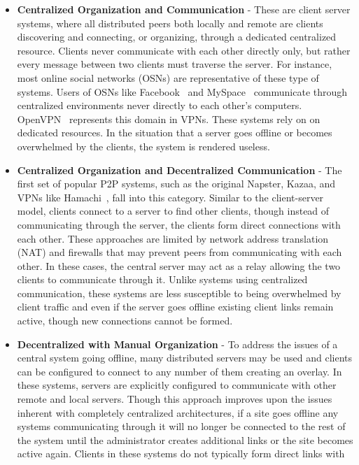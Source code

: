 \begin{itemize}
\item \textbf{Centralized Organization and Communication} - These are client
server systems, where all distributed peers both locally and remote are clients
discovering and connecting, or organizing, through a dedicated centralized
resource. Clients never communicate with each other directly only, but rather
every message between two clients must traverse the server.  For instance, most
online social networks (OSNs) are representative of these type of systems.
Users of OSNs like Facebook~\cite{facebook} and MySpace~\cite{myspace}
communicate through centralized environments never directly to each other's
computers.  OpenVPN~\cite{openvpn} represents this domain in VPNs.  These
systems rely on on dedicated resources.  In the situation that a server goes
offline or becomes overwhelmed by the clients, the system is rendered useless.
\item \textbf{Centralized Organization and Decentralized Communication} - The
first set of popular P2P systems, such as the original Napster, Kazaa, and VPNs
like Hamachi~\cite{hamachi}, fall into this category.  Similar to the
client-server model, clients connect to a server to find other clients, though
instead of communicating through the server, the clients form direct
connections with each other.  These approaches are limited by network address
translation (NAT) and firewalls that may prevent peers from communicating with
each other.  In these cases, the central server may act as a relay allowing the
two clients to communicate through it.  Unlike systems using centralized
communication, these systems are less susceptible to being overwhelmed by
client traffic and even if the server goes offline existing client links remain
active, though new connections cannot be formed.
\item \textbf{Decentralized with Manual Organization} - To address the issues
of a central system going offline, many distributed servers may be used and
clients can be configured to connect to any number of them creating an overlay.
In these systems, servers are explicitly configured to communicate with other
remote and local servers.  Though this approach improves upon the issues
inherent with completely centralized architectures, if a site goes offline any
systems communicating through it will no longer be connected to the rest of the
system until the administrator creates additional links or the site becomes
active again.  Clients in these systems do not typically form direct links with

\end{itemize}
